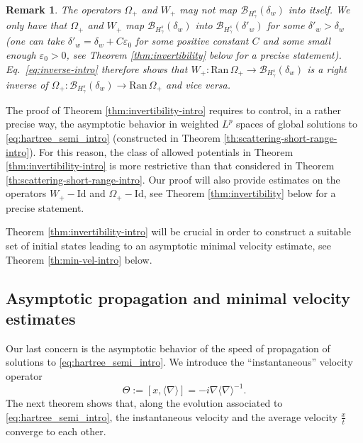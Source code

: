 \documentclass[12pt]{article}
\theoremstyle{plain}
\newtheorem{rem}[theo]{Remark}
\begin{document}
\begin{rem}
    The operators $\Omega_+$ and $W_+$ may not map $\mathcal{B}_{H^s_\gamma}(\delta_w)$ into itself. We only have that $\Omega_+$ and $W_+$ map $\mathcal{B}_{H^s_\gamma}(\delta_w)$ into $\mathcal{B}_{H^s_\gamma}(\delta'_w)$ for some $\delta'_w>\delta_w$ (one can take $\delta'_w=\delta_w+C\varepsilon_0$ for some positive constant $C$ and some small enough $\varepsilon_0>0$, see Theorem \ref{thm:invertibility} below for a precise statement). Eq.~\eqref{eq:inverse-intro} therefore shows that $W_+:\mathrm{Ran}\,\Omega_+\to\mathcal{B}_{H^s_\gamma}(\delta_w)$ is a right inverse of $\Omega_+:\mathcal{B}_{H^s_\gamma}(\delta_w)\to\mathrm{Ran}\,\Omega_+$ and vice versa.  
\end{rem}

The proof of Theorem \ref{thm:invertibility-intro} requires to control, in a rather precise way, the asymptotic behavior in weighted $L^p$ spaces of global solutions to  \eqref{eq:hartree_semi_intro} (constructed in Theorem \ref{th:scattering-short-range-intro}). For this reason, the class of allowed potentials in Theorem \ref{thm:invertibility-intro} is more restrictive than that considered in Theorem \ref{th:scattering-short-range-intro}. Our proof will also provide estimates on the operators $W_+-\mathrm{Id}$ and $\Omega_+-\mathrm{Id}$, see Theorem \ref{thm:invertibility} below for a precise statement.  

Theorem \ref{thm:invertibility-intro} will be crucial in order to construct a suitable set of initial states leading to an asymptotic minimal velocity estimate, see Theorem \ref{th:min-vel-intro} below.

\subsection{Asymptotic propagation and minimal velocity estimates}

Our last concern is the asymptotic behavior of the speed of propagation of solutions to \eqref{eq:hartree_semi_intro}. We introduce the ``instantaneous'' velocity operator 
\begin{equation*}
\Theta:=[x,\langle\nabla\rangle]=-i\nabla\langle\nabla\rangle^{-1}.
\end{equation*}
The next theorem shows that, along the evolution associated to \eqref{eq:hartree_semi_intro}, the instantaneous velocity and the average velocity $\frac{x}{t}$ converge to each other. 
\end{document}
